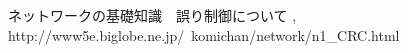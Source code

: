 \documentclass[a4j]{celb-report}
\begin{document}


\begin{thebibliography}{9}
 ネットワークの基礎知識　誤り制御について , http://www5e.biglobe.ne.jp/~komichan/network/n1\_CRC.html
\end{thebibliography}
%
\end{document}
